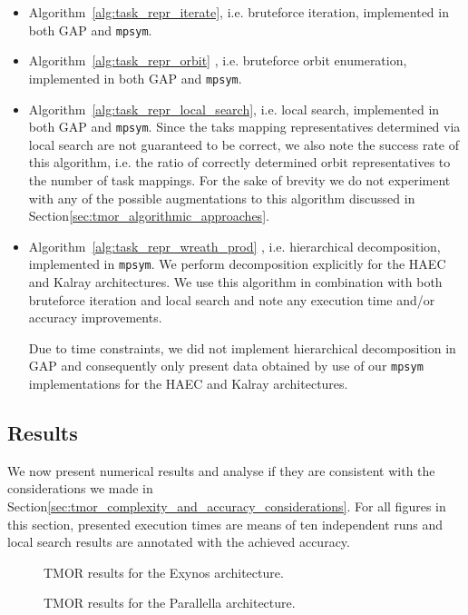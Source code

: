 \begin{itemize}
\item Algorithm~\ref{alg:task_repr_iterate}, i.e. bruteforce iteration,
implemented in both GAP and \texttt{mpsym}.

\item Algorithm~\ref{alg:task_repr_orbit} , i.e. bruteforce orbit enumeration,
implemented in both GAP and \texttt{mpsym}.

\item Algorithm~\ref{alg:task_repr_local_search}, i.e. local search,
implemented in both GAP and \texttt{mpsym}. Since the taks mapping
representatives determined via local search are not guaranteed to be correct,
we also note the success rate of this algorithm, i.e. the ratio of correctly
determined orbit representatives to the number of task mappings.  For the sake
of brevity we do not experiment with any of the possible augmentations to this
algorithm discussed in Section\ref{sec:tmor_algorithmic_approaches}.

\item Algorithm~\ref{alg:task_repr_wreath_prod} , i.e. hierarchical
decomposition, implemented in \texttt{mpsym}. We perform decomposition
explicitly for the HAEC and Kalray architectures. We use this algorithm in
combination with both bruteforce iteration and local search and note any
execution time and/or accuracy improvements.

Due to time constraints, we did not implement hierarchical decomposition in GAP
and consequently only present data obtained by use of our \texttt{mpsym}
implementations for the HAEC and Kalray architectures.
\end{itemize}

\subsection{Results}
\label{sec:exp_repr_results}

We now present numerical results and analyse if they are consistent with the
considerations we made in
Section\ref{sec:tmor_complexity_and_accuracy_considerations}.  For all figures
in this section, presented execution times are means of ten independent runs
and local search results are annotated with the achieved accuracy.

\begin{figure}
  \centering
  \caption{TMOR results for the Exynos architecture.}
  \label{fig:exynos_lineplot}
  \vspace{1cm}
  \caption{TMOR results for the Parallella architecture.}
  \label{fig:parallella_lineplot}
\end{figure}

